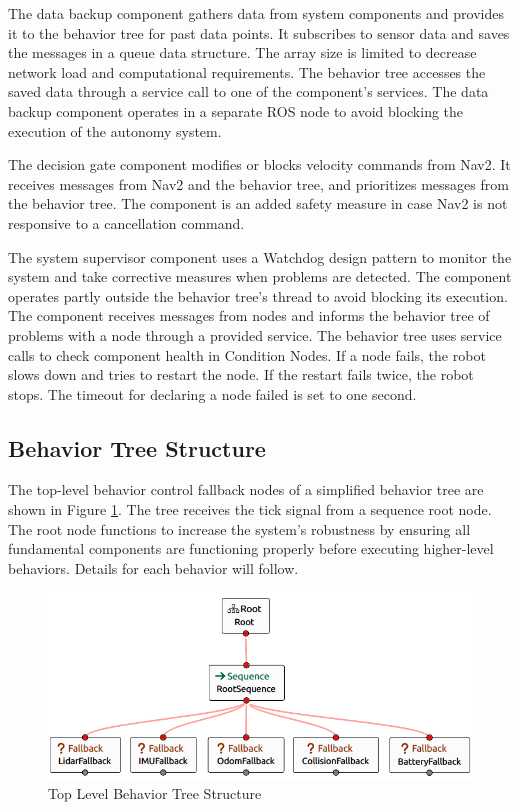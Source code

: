 \documentclass[letterpaper, 10pt, conference]{ieeeconf}
\begin{document}
The data backup component gathers data from system components and provides it to the behavior tree for past data points. It subscribes to sensor data and saves the messages in a queue data structure. The array size is limited to decrease network load and computational requirements. The behavior tree accesses the saved data through a service call to one of the component's services. The data backup component operates in a separate ROS node to avoid blocking the execution of the autonomy system.

The decision gate component modifies or blocks velocity commands from Nav2. It receives messages from Nav2 and the behavior tree, and prioritizes messages from the behavior tree. The component is an added safety measure in case Nav2 is not responsive to a cancellation command.

The system supervisor component uses a Watchdog design pattern to monitor the system and take corrective measures when problems are detected. The component operates partly outside the behavior tree's thread to avoid blocking its execution. The component receives messages from nodes and informs the behavior tree of problems with a node through a provided service. The behavior tree uses service calls to check component health in Condition Nodes. If a node fails, the robot slows down and tries to restart the node. If the restart fails twice, the robot stops. The timeout for declaring a node failed is set to one second.

\subsection{Behavior Tree Structure}

The top-level behavior control fallback nodes of a simplified behavior tree are shown in Figure \ref{fig:top_level_bt}. The tree receives the tick signal from a sequence root node. The root node functions to increase the system's robustness by ensuring all fundamental components are functioning properly before executing higher-level behaviors. Details for each behavior will follow.

\begin{figure}[ht]
	\centering
	\includegraphics[width=0.5\linewidth]{Figures/top_level_bt.png}
	\caption{Top Level Behavior Tree Structure}
	\label{fig:top_level_bt}
\end{figure}
\end{document}
